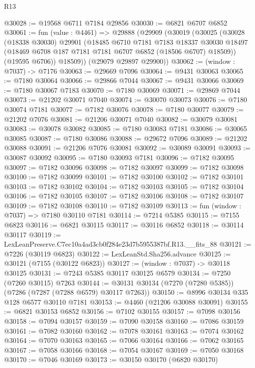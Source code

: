 \begin{lexlean}{R13}
\begin{coremodule}
@30028 := @19568 @6711 @7184 @29856
@30030 := @6821 @6707 @6852
@30061 := fun (value : @4461) =>
  @29888
    (@29909
      (@30019
        (@30025
          (@30028
            (@18338 @30030)
            @29901
            (@18485
              @6710
              @7181
              @7183
              @18337
              @30030
              @18497
              (@18469 @6708 @187 @7181 @7181 @6707 @6852 (@18506 @6707) @18509))
            (@19595 @6706))
          @18509))
      (@29079 @29897 @29900))
@30062 := (window : @7037) -> @7176
@30063 := @29669 @7096
@30064 := @9431 @30063
@30065 := @7180 @30064
@30066 := @29866 @7044
@30067 := @9431 @30066
@30069 := @7180 @30067 @7183
@30070 := @7180 @30069
@30071 := @29869 @7044
@30073 := @21202 @30071 @7040
@30074 := @30070 @30073
@30076 := @7180 @30074 @7181
@30077 := @7182 @30076
@30078 := @7180 @30077
@30079 := @21202 @7076
@30081 := @21206 @30071 @7040
@30082 := @30079 @30081
@30083 := @30078 @30082
@30085 := @7180 @30083 @7181
@30086 := @30065 @30085
@30087 := @7180 @30086
@30088 := @29672 @7096
@30089 := @21202 @30088
@30091 := @21206 @7076 @30081
@30092 := @30089 @30091
@30093 := @30087 @30092
@30095 := @7180 @30093 @7181
@30096 := @7182 @30095
@30097 := @7182 @30096
@30098 := @7182 @30097
@30099 := @7182 @30098
@30100 := @7182 @30099
@30101 := @7182 @30100
@30102 := @7182 @30101
@30103 := @7182 @30102
@30104 := @7182 @30103
@30105 := @7182 @30104
@30106 := @7182 @30105
@30107 := @7182 @30106
@30108 := @7182 @30107
@30109 := @7182 @30108
@30110 := @7182 @30109
@30113 := fun (window : @7037) => @7180 @30110 @7181
@30114 := @7214 @5385
@30115 := @7155 @6823
@30116 := @6821 @30115
@30117 := @30116 @6852
@30118 := @30114 @30117
@30119 := LexLeanPreserve.C7ec10a4ad3cb0f284e23d7b5955387bf.R13.__fits_88
@30121 := @7226 (@30119 @6823)
@30122 := LexLeanStd.Sha256.advance
@30125 := @30121 (@7155 (@30122 @6823))
@30127 := (window : @7037) -> @30118 @30125
@30131 := @7243 @5385 @30117 @30125 @6579
@30134 := @7250 (@7260 @30115) @7263
@30144 := @30131 @30134 (@7270 (@7280 @5385)) (@7286 (@7287 (@7288 @6579) @30117 @7263))
@30150 := @8996 @30134 @335 @128 @6577 @30110 @7181
@30153 := @4460 (@21206 @30088 @30091)
@30155 := @6821 @30153 @6852
@30156 := @7102 @30155
@30157 := @7098 @30156
@30158 := @7094 @30157
@30159 := @7090 @30158
@30160 := @7086 @30159
@30161 := @7082 @30160
@30162 := @7078 @30161
@30163 := @7074 @30162
@30164 := @7070 @30163
@30165 := @7066 @30164
@30166 := @7062 @30165
@30167 := @7058 @30166
@30168 := @7054 @30167
@30169 := @7050 @30168
@30170 := @7046 @30169
@30173 := @30150 @30170 (@6820 @30170)

\end{coremodule}
\end{lexlean}
